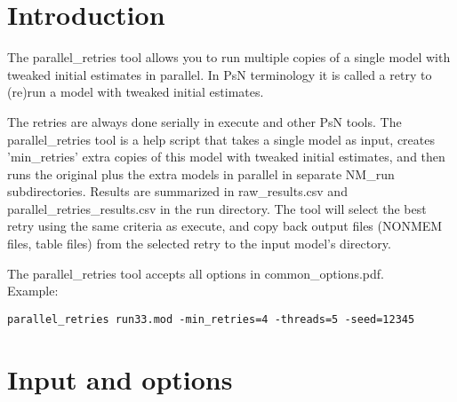 



\maketitle
\newcommand{\guidetoolname}{parallel\_retries}


\section{Introduction}
The parallel\_retries tool allows you to run multiple copies of a single model with tweaked initial estimates in parallel.
In PsN terminology it is called a retry to (re)run a model with tweaked initial estimates.

The retries are always done serially in execute and other PsN tools. The parallel\_retries tool is a help script that takes a single model as input, creates 'min\_retries' extra copies of this model with tweaked initial estimates, and then runs the original plus the extra models in parallel in separate NM\_run subdirectories. Results are summarized in raw\_results.csv and parallel\_retries\_results.csv in the run directory. The tool will select the best retry using the same criteria as execute, and copy back output files (NONMEM files, table files) from the selected retry to the input model's directory.

The parallel\_retries tool accepts all options in common\_options.pdf.\\ 

Example:
\begin{verbatim}
parallel_retries run33.mod -min_retries=4 -threads=5 -seed=12345
\end{verbatim}

\section{Input and options}
